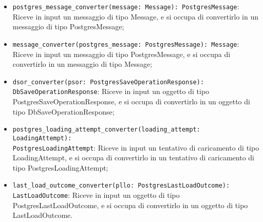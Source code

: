 \begin{itemize}
    \item \texttt{postgres\_message\_converter(message: Message): PostgresMessage}: Riceve in input un messaggio di tipo Message, e si occupa di convertirlo in un messaggio di tipo PostgresMessage;
    \item \texttt{message\_converter(postgres\_message: PostgresMessage): Message}: Riceve in input un messaggio di tipo PostgresMessage, e si occupa di convertirlo in un messaggio di tipo Message;
    \item \texttt{dsor\_converter(psor: PostgresSaveOperationResponse): DbSaveOperationResponse}: Riceve in input un oggetto di tipo PostgresSaveOperationResponse, e si occupa di convertirlo in un oggetto di tipo DbSaveOperationResponse;
    \item \texttt{postgres\_loading\_attempt\_converter(loading\_attempt: LoadingAttempt):\\ PostgresLoadingAttempt}: Riceve in input un tentativo di caricamento di tipo LoadingAttempt, e si occupa di convertirlo in un tentativo di caricamento di tipo PostgresLoadingAttempt;
    \item \texttt{last\_load\_outcome\_converter(pllo: PostgresLastLoadOutcome): LastLoadOutcome}: Riceve in input un oggetto di tipo PostgresLastLoadOutcome, e si occupa di convertirlo in un oggetto di tipo LastLoadOutcome.
\end{itemize}

\newpage



\label{sec:repository}

